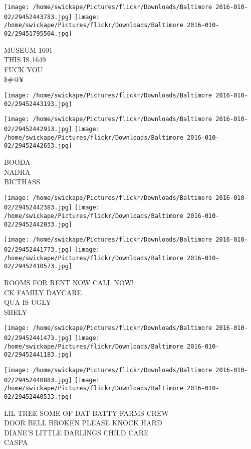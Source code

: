 \documentclass[10pt,letterpaper]{article}
\begin{document}
\texttt{[image: /home/swickape/Pictures/flickr/Downloads/Baltimore 2016-010-02/29452443783.jpg]}
\texttt{[image: /home/swickape/Pictures/flickr/Downloads/Baltimore 2016-010-02/29451795504.jpg]}

MUSEUM 1601\\
THIS IS 1649\\
FUCK YOU\\
\$\#@¥
\pagebreak

\texttt{[image: /home/swickape/Pictures/flickr/Downloads/Baltimore 2016-010-02/29452443193.jpg]}

\vspace{0.25in}
\texttt{[image: /home/swickape/Pictures/flickr/Downloads/Baltimore 2016-010-02/29452442913.jpg]}
\texttt{[image: /home/swickape/Pictures/flickr/Downloads/Baltimore 2016-010-02/29452442653.jpg]}

BOODA\\
NADRA\\
BICTHASS
\pagebreak

\texttt{[image: /home/swickape/Pictures/flickr/Downloads/Baltimore 2016-010-02/29452442383.jpg]}
\texttt{[image: /home/swickape/Pictures/flickr/Downloads/Baltimore 2016-010-02/29452442033.jpg]}

\texttt{[image: /home/swickape/Pictures/flickr/Downloads/Baltimore 2016-010-02/29452441773.jpg]}
\texttt{[image: /home/swickape/Pictures/flickr/Downloads/Baltimore 2016-010-02/29452410573.jpg]}

ROOMS FOR RENT NOW CALL NOW!\\
CK FAMILY DAYCARE\\
QUA IS UGLY\\
SHELY
\pagebreak

\texttt{[image: /home/swickape/Pictures/flickr/Downloads/Baltimore 2016-010-02/29452441473.jpg]}
\texttt{[image: /home/swickape/Pictures/flickr/Downloads/Baltimore 2016-010-02/29452441183.jpg]}

\texttt{[image: /home/swickape/Pictures/flickr/Downloads/Baltimore 2016-010-02/29452440883.jpg]}
\texttt{[image: /home/swickape/Pictures/flickr/Downloads/Baltimore 2016-010-02/29452440533.jpg]}

LIL TREE SOME OF DAT BATTY FARMS CREW\\
DOOR BELL BROKEN PLEASE KNOCK HARD\\
DIANE'S LITTLE DARLINGS CHILD CARE\\
CASPA
\pagebreak
\end{document}
